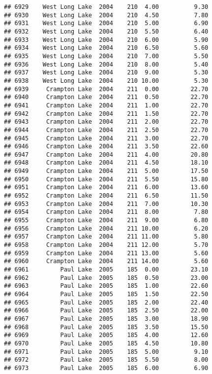 \documentclass[
]{article}
\begin{document}
\begin{verbatim}
## 6929    West Long Lake  2004    210  4.00          9.30
## 6930    West Long Lake  2004    210  4.50          7.80
## 6931    West Long Lake  2004    210  5.00          6.90
## 6932    West Long Lake  2004    210  5.50          6.40
## 6933    West Long Lake  2004    210  6.00          5.90
## 6934    West Long Lake  2004    210  6.50          5.60
## 6935    West Long Lake  2004    210  7.00          5.50
## 6936    West Long Lake  2004    210  8.00          5.40
## 6937    West Long Lake  2004    210  9.00          5.30
## 6938    West Long Lake  2004    210 10.00          5.30
## 6939     Crampton Lake  2004    211  0.00         22.70
## 6940     Crampton Lake  2004    211  0.50         22.70
## 6941     Crampton Lake  2004    211  1.00         22.70
## 6942     Crampton Lake  2004    211  1.50         22.70
## 6943     Crampton Lake  2004    211  2.00         22.70
## 6944     Crampton Lake  2004    211  2.50         22.70
## 6945     Crampton Lake  2004    211  3.00         22.70
## 6946     Crampton Lake  2004    211  3.50         22.60
## 6947     Crampton Lake  2004    211  4.00         20.80
## 6948     Crampton Lake  2004    211  4.50         18.10
## 6949     Crampton Lake  2004    211  5.00         17.50
## 6950     Crampton Lake  2004    211  5.50         15.80
## 6951     Crampton Lake  2004    211  6.00         13.60
## 6952     Crampton Lake  2004    211  6.50         11.50
## 6953     Crampton Lake  2004    211  7.00         10.30
## 6954     Crampton Lake  2004    211  8.00          7.80
## 6955     Crampton Lake  2004    211  9.00          6.80
## 6956     Crampton Lake  2004    211 10.00          6.20
## 6957     Crampton Lake  2004    211 11.00          5.80
## 6958     Crampton Lake  2004    211 12.00          5.70
## 6959     Crampton Lake  2004    211 13.00          5.60
## 6960     Crampton Lake  2004    211 14.00          5.60
## 6961         Paul Lake  2005    185  0.00         23.10
## 6962         Paul Lake  2005    185  0.50         23.00
## 6963         Paul Lake  2005    185  1.00         22.60
## 6964         Paul Lake  2005    185  1.50         22.50
## 6965         Paul Lake  2005    185  2.00         22.40
## 6966         Paul Lake  2005    185  2.50         22.00
## 6967         Paul Lake  2005    185  3.00         18.90
## 6968         Paul Lake  2005    185  3.50         15.50
## 6969         Paul Lake  2005    185  4.00         12.60
## 6970         Paul Lake  2005    185  4.50         10.80
## 6971         Paul Lake  2005    185  5.00          9.10
## 6972         Paul Lake  2005    185  5.50          8.00
## 6973         Paul Lake  2005    185  6.00          6.90

\end{verbatim}
\end{document}
